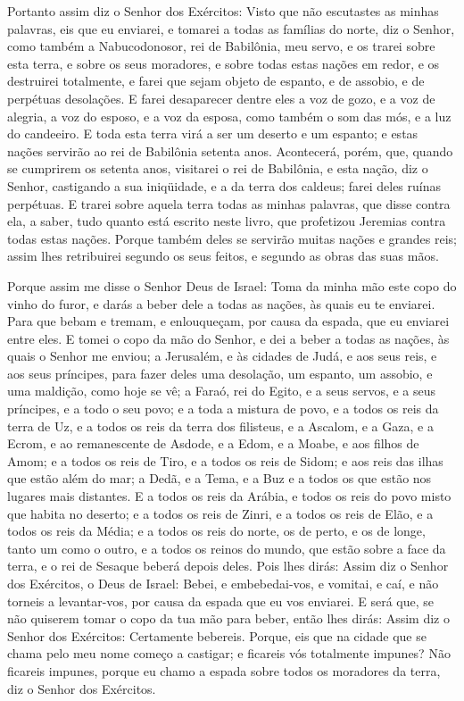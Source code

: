 Portanto assim diz o Senhor dos Exércitos: Visto que não
escutastes as minhas palavras, eis que eu enviarei, e tomarei a
todas as famílias do norte, diz o Senhor, como também a
Nabucodonosor, rei de Babilônia, meu servo, e os trarei sobre esta
terra, e sobre os seus moradores, e sobre todas estas nações em
redor, e os destruirei totalmente, e farei que sejam objeto de
espanto, e de assobio, e de perpétuas desolações. E farei
desaparecer dentre eles a voz de gozo, e a voz de alegria, a voz do
esposo, e a voz da esposa, como também o som das mós, e a luz do
candeeiro. E toda esta terra virá a ser um deserto e um
espanto; e estas nações servirão ao rei de Babilônia setenta anos.
Acontecerá, porém, que, quando se cumprirem os setenta anos,
visitarei o rei de Babilônia, e esta nação, diz o Senhor, castigando
a sua iniqüidade, e a da terra dos caldeus; farei deles ruínas
perpétuas. E trarei sobre aquela terra todas as minhas
palavras, que disse contra ela, a saber, tudo quanto está escrito
neste livro, que profetizou Jeremias contra todas estas nações.
Porque também deles se servirão muitas nações e grandes reis;
assim lhes retribuirei segundo os seus feitos, e segundo as obras
das suas mãos.

Porque assim me disse o Senhor Deus de Israel: Toma da minha mão
este copo do vinho do furor, e darás a beber dele a todas as nações,
às quais eu te enviarei. Para que bebam e tremam, e
enlouqueçam, por causa da espada, que eu enviarei entre eles.
E tomei o copo da mão do Senhor, e dei a beber a todas as
nações, às quais o Senhor me enviou; a Jerusalém, e às
cidades de Judá, e aos seus reis, e aos seus príncipes, para fazer
deles uma desolação, um espanto, um assobio, e uma maldição, como
hoje se vê; a Faraó, rei do Egito, e a seus servos, e a seus
príncipes, e a todo o seu povo; e a toda a mistura de povo, e
a todos os reis da terra de Uz, e a todos os reis da terra dos
filisteus, e a Ascalom, e a Gaza, e a Ecrom, e ao remanescente de
Asdode, e a Edom, e a Moabe, e aos filhos de Amom; e a
todos os reis de Tiro, e a todos os reis de Sidom; e aos reis das
ilhas que estão além do mar; a Dedã, e a Tema, e a Buz e a
todos os que estão nos lugares mais distantes. E a todos os
reis da Arábia, e todos os reis do povo misto que habita no deserto;
e a todos os reis de Zinri, e a todos os reis de Elão, e a
todos os reis da Média; e a todos os reis do norte, os de
perto, e os de longe, tanto um como o outro, e a todos os reinos do
mundo, que estão sobre a face da terra, e o rei de Sesaque beberá
depois deles. Pois lhes dirás: Assim diz o Senhor dos
Exércitos, o Deus de Israel: Bebei, e embebedai-vos, e vomitai, e
caí, e não torneis a levantar-vos, por causa da espada que eu vos
enviarei. E será que, se não quiserem tomar o copo da tua mão
para beber, então lhes dirás: Assim diz o Senhor dos Exércitos:
Certamente bebereis. Porque, eis que na cidade que se chama
pelo meu nome começo a castigar; e ficareis vós totalmente impunes?
Não ficareis impunes, porque eu chamo a espada sobre todos os
moradores da terra, diz o Senhor dos Exércitos.

